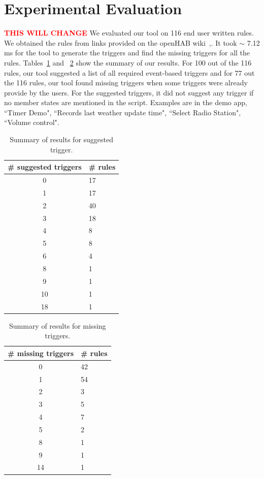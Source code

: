 \documentclass{sig-alternate-05-2015}
\newcommand\todo[1]{\textbf{\textcolor{red}{#1}}}
\begin{document}
\section{Experimental Evaluation}
\todo{THIS WILL CHANGE}
We evaluated our tool on 116 end user written rules. We obtained the rules from links provided on the openHAB wiki~\cite{data1},\cite{data2}. It took $\sim$ 7.12 ms for the tool to generate the triggers and find the missing triggers for all the rules. Tables~\ref{tab:results1} and ~\ref{tab:results2} show the summary of our results. For 100 out of the 116 rules, our tool suggested a list of all required event-based triggers and for 77 out the 116 rules, our tool found missing triggers when some triggers were already provide by the users. For the suggested triggers, it did not suggest any trigger if no member states are mentioned in the script. Examples are in the demo app, ``Timer Demo", ``Records last weather update time", ``Select Radio Station", ``Volume control".
\begin{table}[ht]
\centering
\begin{tabular}{|c|p{1.1cm}|}
\hline
\# suggested triggers & \# rules \\ \hline
0 & 17\\ \hline
1 & 17\\ \hline
2 & 40\\ \hline
3 & 18\\ \hline
4 & 8\\ \hline
5 & 8\\ \hline
6 & 4\\ \hline
8 & 1\\ \hline
9 & 1\\ \hline
10 & 1\\ \hline
18 & 1\\ \hline
\end{tabular}
\caption{Summary of results for suggested trigger.}
\label{tab:results1}
\end{table}

\begin{table}[ht]
\centering
\begin{tabular}{|c|p{1.1cm}|}
\hline
\# missing triggers & \# rules \\ \hline
0 & 42 \\\hline
1 & 54 \\\hline
2 & 3 \\\hline
3 & 5\\\hline
4 & 7\\\hline
5 & 2\\\hline
8 & 1 \\\hline
9 & 1 \\\hline
14 & 1 \\\hline
\end{tabular}
\caption{Summary of results for missing triggers.}
\label{tab:results2}
\end{table}
\end{document}
